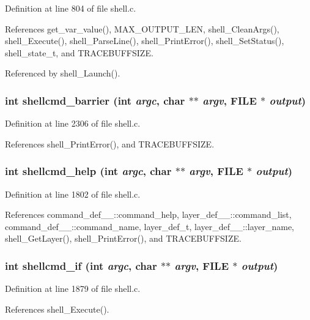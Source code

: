 Definition at line 804 of file shell.c.

References get\_\-var\_\-value(), MAX\_\-OUTPUT\_\-LEN, shell\_\-Clean\-Args(), shell\_\-Execute(), shell\_\-Parse\-Line(), shell\_\-Print\-Error(), shell\_\-Set\-Status(), shell\_\-state\_\-t, and TRACEBUFFSIZE.

Referenced by shell\_\-Launch().
\subsubsection{\setlength{\rightskip}{0pt plus 5cm}int shellcmd\_\-barrier (int {\em argc}, char $\ast$$\ast$ {\em argv}, FILE $\ast$ {\em output})}\label{shell_8c_a53}




Definition at line 2306 of file shell.c.

References shell\_\-Print\-Error(), and TRACEBUFFSIZE.
\subsubsection{\setlength{\rightskip}{0pt plus 5cm}int shellcmd\_\-help (int {\em argc}, char $\ast$$\ast$ {\em argv}, FILE $\ast$ {\em output})}\label{shell_8c_a44}




Definition at line 1802 of file shell.c.

References command\_\-def\_\-\_\-::command\_\-help, layer\_\-def\_\-\_\-::command\_\-list, command\_\-def\_\-\_\-::command\_\-name, layer\_\-def\_\-t, layer\_\-def\_\-\_\-::layer\_\-name, shell\_\-Get\-Layer(), shell\_\-Print\-Error(), and TRACEBUFFSIZE.
\subsubsection{\setlength{\rightskip}{0pt plus 5cm}int shellcmd\_\-if (int {\em argc}, char $\ast$$\ast$ {\em argv}, FILE $\ast$ {\em output})}\label{shell_8c_a45}




Definition at line 1879 of file shell.c.

References shell\_\-Execute().
